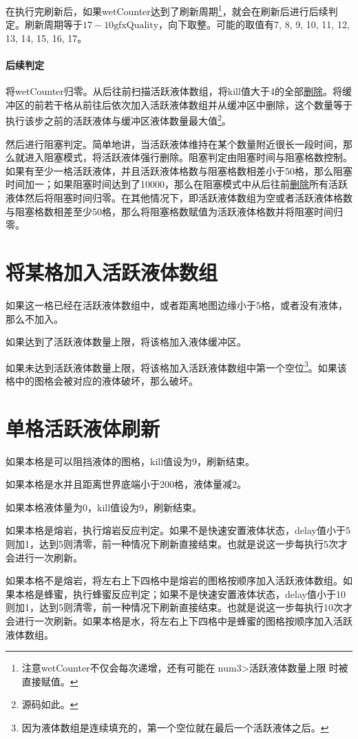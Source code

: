在执行完刷新后，如果wetCounter达到了刷新周期\footnote{注意wetCounter不仅会每次递增，还有可能在$\textrm{num3}>\textrm{活跃液体数量上限}$时被直接赋值。}，就会在刷新后进行后续判定。刷新周期等于$17-10\textrm{gfxQuality}$，向下取整。可能的取值有7, 8, 9, 10, 11, 12, 13, 14, 15, 16, 17。

\paragraph*{后续判定}\label{app29}
将wetCounter归零。从后往前扫描活跃液体数组，将kill值大于4的全部\hyperref[app28]{删除}。将缓冲区的前若干格从前往后依次加入活跃液体数组并从缓冲区中删除，这个数量等于执行该步之前的活跃液体与缓冲区液体数量最大值\footnote{源码如此。}。

然后进行阻塞判定。简单地讲，当活跃液体维持在某个数量附近很长一段时间，那么就进入阻塞模式，将活跃液体强行删除。阻塞判定由阻塞时间与阻塞格数控制。如果有至少一格活跃液体，并且活跃液体格数与阻塞格数相差小于50格，那么阻塞时间加一；如果阻塞时间达到了10000，那么在阻塞模式中从后往前\hyperref[app28]{删除}所有活跃液体然后将阻塞时间归零。在其他情况下，即活跃液体数组为空或者活跃液体格数与阻塞格数相差至少50格，那么将阻塞格数赋值为活跃液体格数并将阻塞时间归零。

\section{将某格加入活跃液体数组}
如果这一格已经在活跃液体数组中，或者距离地图边缘小于5格，或者没有液体，那么不加入。

如果达到了活跃液体数量上限，将该格加入液体缓冲区。

如果未达到活跃液体数量上限，将该格加入活跃液体数组中第一个空位\footnote{因为液体数组是连续填充的，第一个空位就在最后一个活跃液体之后。}。如果该格中的图格会被对应的液体破坏，那么破坏。

\section{单格活跃液体刷新}\label{app26}
如果本格是可以阻挡液体的图格，kill值设为9，刷新结束。

如果本格是水并且距离世界底端小于200格，液体量减2。

如果本格液体量为0，kill值设为9，刷新结束。

如果本格是熔岩，执行熔岩反应判定。如果不是快速安置液体状态，delay值小于5则加1，达到5则清零，前一种情况下刷新直接结束。也就是说这一步每执行5次才会进行一次刷新。

如果本格不是熔岩，将左右上下四格中是熔岩的图格按顺序加入活跃液体数组。如果本格是蜂蜜，执行蜂蜜反应判定；如果不是快速安置液体状态，delay值小于10则加1，达到5则清零，前一种情况下刷新直接结束。也就是说这一步每执行10次才会进行一次刷新。如果本格是水，将左右上下四格中是蜂蜜的图格按顺序加入活跃液体数组。

